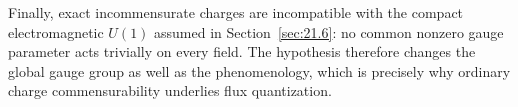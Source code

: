 \begin{enumerate}
  Finally, exact incommensurate charges are incompatible with the
  compact electromagnetic \(U(1)\) assumed in Section~\ref{sec:21.6}:
  no common nonzero gauge parameter acts trivially on every field.  The
  hypothesis therefore changes the global gauge group as well as the
  phenomenology, which is precisely why ordinary charge
  commensurability underlies flux quantization.
\end{enumerate}
